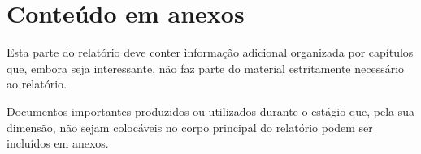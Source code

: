 \chapter{Conte\'udo em anexos} %
\label{chap:conteudo_anexos}

Esta parte do relatório deve conter informação adicional organizada por capítulos que, embora seja interessante, não faz parte do material estritamente necessário ao relatório.

Documentos importantes produzidos ou utilizados durante o estágio que, pela sua dimensão, não sejam colocáveis no corpo principal do relatório podem ser incluídos em anexos.

